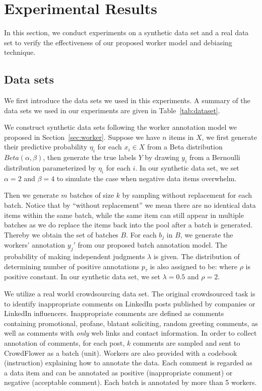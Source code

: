 \section{Experimental Results}
\label{sec:exp}

In this section, we conduct experiments on a synthetic data set and a real data set 
to verify the effectiveness of our proposed worker model and debiasing technique.  

\subsection{Data sets}
We first introduce the data sets we used in this experiments.  
A summary of the data sets we used in our experiments are given in Table~\ref{tab:dataset}.  

We construct synthetic data sets following the worker annotation model we proposed in Section~\ref{sec:worker}.
Suppose we have $n$ items in $X$, 
we first generate their predictive probability $\eta_i$ for each $x_i \in X$ 
from a Beta distribution $Beta(\alpha, \beta)$, 
then generate the true labels $Y$ by drawing $y_i$ from a Bernoulli distribution parameterized by $\eta_i$ for each $i$.  
In our synthetic data set, we set $\alpha = 2$ and $\beta = 4$ to simulate the case when negative data items overwhelm.

Then we generate $m$ batches of size $k$ by sampling without replacement for each batch.  
Notice that by ``without replacement'' we mean there are no identical data items within the same batch, 
while the same item can still appear in multiple batches 
as we do replace the items back into the pool after a batch is generated.  
Thereby we obtain the set of batches $B$.  
For each $b_j$ in $B$, we generate the workers' annotation $y_j'$ from our proposed batch annotation model.  
The probability of making independent judgments $\lambda$ is given.
The distribution of determining number of positive annotations $p_{\tau}$ is also assigned to be:
%
where $\rho$ is positive constant.  
In our synthetic data set, we set $\lambda = 0.5$ and $\rho = 2$.  

We utilize a real world crowdsourcing data set.  
The original crowdsourced task is to identify inappropriate comments on LinkedIn posts published by companies or LinkedIn influencers.  
Inappropriate comments are defined as comments containing promotional, profane, blatant soliciting, random greeting comments, 
as well as comments with \emph{only} web links and contact information.  
In order to collect annotation of comments, 
for each post, $k$ comments are sampled and sent to CrowdFlower as a batch (unit).  
Workers are also provided with a codebook (instruction) explaining how to annotate the data.  
Each comment is regarded as a data item and can be annotated as positive (inappropriate comment) or negative (acceptable comment).  
Each batch is annotated by more than 5 workers.  


